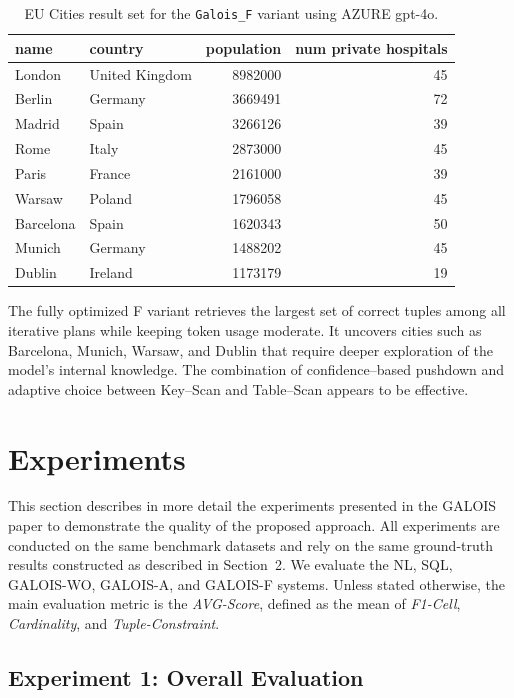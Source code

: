 \documentclass[11pt]{article}
\begin{document}
\clearpage
\begin{table}[t]
\centering
\begin{tabular}{l l r r}
\toprule
name      & country          & population & num private hospitals \\
\midrule
London    & United Kingdom   & 8982000 & 45 \\
Berlin    & Germany          & 3669491 & 72 \\
Madrid    & Spain            & 3266126 & 39 \\
Rome      & Italy            & 2873000 & 45 \\
Paris     & France           & 2161000 & 39 \\
Warsaw    & Poland           & 1796058 & 45 \\
Barcelona & Spain            & 1620343 & 50 \\
Munich    & Germany          & 1488202 & 45 \\
Dublin    & Ireland          & 1173179 & 19 \\
\bottomrule
\end{tabular}
\caption{EU Cities result set for the \texttt{Galois\_F} variant using AZURE gpt-4o.}
\end{table}


The fully optimized F variant retrieves the largest set of correct tuples among all iterative plans while keeping token usage moderate. It uncovers cities such as Barcelona, Munich, Warsaw, and Dublin that require deeper exploration of the model’s internal knowledge. The combination of confidence–based pushdown and adaptive choice between Key–Scan and Table–Scan appears to be effective.

\clearpage
\section{Experiments}

This section describes in more detail the experiments presented in the GALOIS paper to demonstrate the quality of the proposed approach.
All experiments are conducted on the same benchmark datasets and rely on the same ground-truth results constructed as described in Section~2.
We evaluate the NL, SQL, GALOIS-WO, GALOIS-A, and GALOIS-F systems.
Unless stated otherwise, the main evaluation metric is the \textit{AVG-Score}, defined as the mean of \textit{F1-Cell}, \textit{Cardinality}, and \textit{Tuple-Constraint}.

\subsection{Experiment 1: Overall Evaluation}
\end{document}
